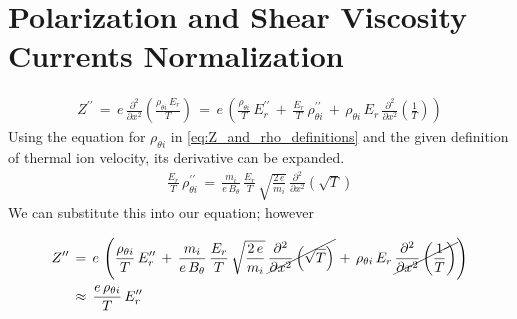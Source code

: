 \chapter{Polarization and Shear Viscosity Currents Normalization}\label{chapter:Normalization}
\begin{align}
	Z^{\prime\prime} \,=\, e \, \frac{\partial^2}{\partial x^2}
		\left(\frac{\rho_{\theta i} \, E_r}{T}\right) \,=\, e \, \left(
		\frac{\rho_{\theta i}}{T} \, E_r^{\prime\prime} \,+\, \frac{E_r}{T} \,
		\rho_{\theta i}^{\prime\prime} \,+\, \rho_{\theta i}\, E_r \,
		\frac{\partial^2}{\partial x^2}\left(\frac{1}{T}\right)\right)
\end{align}
Using the equation for $\rho_{\theta i}$ in \ref{eq:Z_and_rho_definitions} and the given definition of thermal ion velocity, its derivative can be expanded.
\begin{align}
	\frac{E_r}{T} \, \rho_{\theta i}^{\prime\prime} \,=\,
		\frac{m_i}{e\,B_\theta} \, \frac{E_r}{T} \,\sqrt{\frac{2\,e}{m_i}} \,
		\frac{\partial^2}{\partial x^2}\left(\sqrt{T}\right)
\end{align}
We can substitute this into our equation; however

\begin{align}
	Z^{\prime\prime} \,&=\, e \, \left(\frac{\rho_{\theta i}}{T} \,
		E_r^{\prime\prime} \,+\, \frac{m_i}{e\,B_\theta} \, \frac{E_r}{T} \,
		\sqrt{\frac{2\,e}{m_i}} \, \cancel{\frac{\partial^2}{\partial x^2}
		\left(\sqrt{T}\right)} \,+\, \rho_{\theta i}\, E_r \, \cancel{
		\frac{\partial^2}{\partial x^2} \left(\frac{1}{T}\right)}\right) \\
		&\approx\, \frac{e\,\rho_{\theta i}}{T} \, E_r^{\prime\prime}
\end{align}

